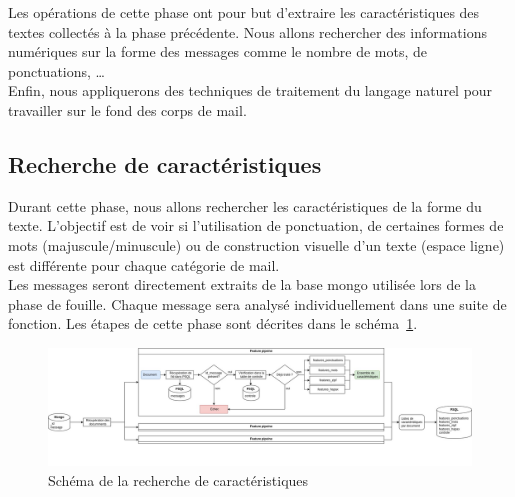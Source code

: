 Les opérations de cette phase ont pour but d'extraire les caractéristiques des textes collectés à la phase précédente.
Nous allons rechercher des informations numériques sur la forme des messages comme le nombre de mots, de ponctuations, \ldots\\
Enfin, nous appliquerons des techniques de traitement du langage naturel pour travailler sur le fond des corps de mail.


\subsection{Recherche de caractéristiques}
    Durant cette phase, nous allons rechercher les caractéristiques de la forme du texte.
    L'objectif est de voir si l'utilisation de ponctuation, de certaines formes de mots (majuscule/minuscule)
    ou de construction visuelle d'un texte (espace ligne) est différente pour chaque catégorie de mail.\\

    Les messages seront directement extraits de la base mongo utilisée lors de la phase de fouille.
    Chaque message sera analysé individuellement dans une suite de fonction.
    Les étapes de cette phase sont décrites dans le schéma~\ref{fig:Phase2}.

    \begin{figure}[H]
        \includegraphics[width=\linewidth]{img/features}
        \caption{Schéma de la recherche de caractéristiques}
        \label{fig:Phase2}
    \end{figure}




